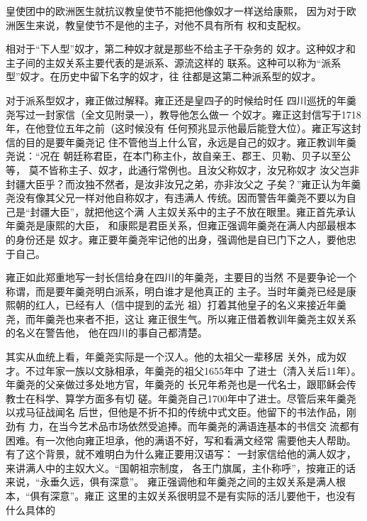 皇使团中的欧洲医生就抗议教皇使节不能把他像奴才一样送给康熙，%
因为对于欧洲医生来说，教皇使节不是他的主子，对他不具有所有%
权和支配权。%
\par
相对于“下人型”奴才，第二种奴才就是那些不给主子干杂务的%
奴才。这种奴才和主子间的主奴关系主要代表的是派系、源流这样的%
联系。这种可以称为“派系型”奴才。在历史中留下名字的奴才，往%
往都是这第二种派系型的奴才。%
\par
对于派系型奴才，雍正做过解释。雍正还是皇四子的时候给时任%
四川巡抚的年羹尧写过一封家信（全文见附录一），教导他怎么做一%
个奴才。雍正这封信写于1718年，在他登位五年之前（这时候没有%
任何预兆显示他最后能登大位）。雍正写这封信的目的是要年羹尧记%
住不管他当上什么官，永远是自己的奴才。雍正教训年羹尧说：“况在%
朝廷称君臣，在本门称主仆，故自亲王、郡王、贝勒、贝子以至公等，%
莫不皆称主子、奴才，此通行常例也。且汝父称奴才，汝兄称奴才%
汝父岂非封疆大臣乎？而汝独不然者，是汝非汝兄之弟，亦非汝父之%
子矣？”雍正认为年羹尧没有像其父兄一样对他自称奴才，有违满人%
传统。因而警告年羹尧不要以为自己是“封疆大臣”，就把他这个满%
人主奴关系中的主子不放在眼里。雍正首先承认年羹尧是康熙的大臣，%
和康熙是君臣关系，但雍正强调年羹尧在满人内部最根本的身份还是%
奴才。雍正要年羹尧牢记他的出身，强调他是自已门下之人，要他忠%
于自己。%
\par
雍正如此郑重地写一封长信给身在四川的年羹尧，主要目的当然%
不是要争论一个称谓，而是要年羹尧明白派系，明白谁才是他真正的%
主子。当时年羹尧已经是康熙朝的红人，已经有人（信中提到的孟光%
祖）打着其他皇子的名义来接近年羹尧，而年羹尧也来者不拒，这让%
雍正很生气。所以雍正借着教训年羹尧主奴关系的名义在警告他，%
他在四川的事自己都清楚。%
\par
其实从血统上看，年羹尧实际是一个汉人。他的太祖父一辈移居%
关外，成为奴才。不过年家一族以文脉相承，年羹尧的祖父1655年中%
了进士（清入关后11年）。年羹尧的父亲做过多处地方官，年羹尧的%
长兄年希尧也是一代名士，跟耶稣会传教士在科学、算学方面多有切%
磋。年羹尧自己1700年中了进士。尽管后来年羹尧以戎马征战闻名%
后世，但他是不折不扣的传统中式文臣。他留下的书法作品，刚劲有%
力，在当今艺术品市场依然受追捧。而年羹尧的满语连基本的书信交%
流都有困难。有一次他向雍正坦承，他的满语不好，写和看满文经常%
需要他夫人帮助。有了这个背景，就不难明白为什么雍正要用汉语写：%
一封家信给他的满人奴才，来讲满人中的主奴大义。“国朝祖宗制度，%
各王门旗属，主仆称呼”，按雍正的话来说，“永垂久远，俱有深意”。%
雍正强调他和年羹尧之间的主奴关系是满人根本，“俱有深意”。雍正%
这里的主奴关系很明显不是有实际的活儿要他干，也没有什么具体的%

